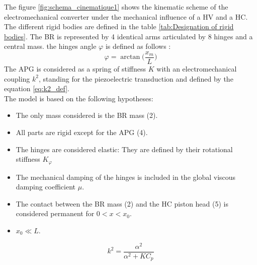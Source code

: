 \documentclass[3p,twocolumn,preprint]{elsarticle}
\begin{document}
The figure \ref{fig:schema_cinematique1} shows the kinematic scheme of the electromechanical converter under the mechanical influence of a HV and a HC. The different rigid bodies are defined in the table \ref{tab:Designation of rigid bodies}. The BR is represented by 4 identical arms articulated by 8 hinges and a central mass. the hinges angle $\varphi$ is defined as follows :
\begin{equation}
	\varphi = \arctan\biggl(\dfrac{x_m}{L}\biggr)
	\label{eq:phi_definition}
\end{equation}
The APG is considered as a spring of stiffness $K$ with an electromechanical coupling $k^2$, standing for the piezoelectric transduction and defined by the equation \ref{eq:k2_def}.\\
The model is based on the following hypotheses:
\begin{itemize}
	\item The only mass considered is the BR mass (2).
	\item All parts are rigid except for the APG (4).
	\item The hinges are considered elastic: They are defined by their rotational stiffness $K_{\varphi}$
	\item The mechanical damping of the hinges is included in the global viscous damping coefficient $\mu$.
	\item The contact between the BR mass (2) and the HC piston head (5) is considered permanent for $0 < x < x_0$.
	\item \mbox{$x_0 \ll L$}. 
\end{itemize}
\begin{equation}
	k^2 = \dfrac{\alpha^2}{\alpha^2 +  K C_p}
	\label{eq:k2_def}
\end{equation}
\begin{table}[!htbp]
\centering
{}
\caption{Definition of figure \ref{fig:schema_cinematique1} bodies}
\label{tab:Designation of rigid bodies}
\end{table}
\end{document}
